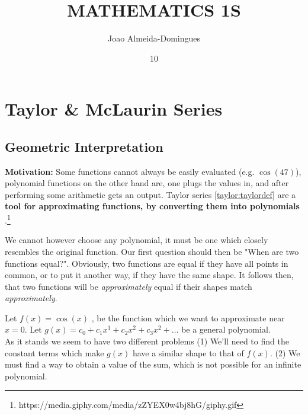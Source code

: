 \documentclass[english,course]{Notes}
\title{MATHEMATICS 1S}
\author{Joao Almeida-Domingues}
\date{10}{01}{2019}
\newcommand{\ita}[1]{\textit{#1}}
\begin{document}
\newpage

\section{Taylor \& McLaurin Series}


\subsection{Geometric Interpretation}
\textbf{Motivation:} Some functions cannot always be easily evaluated (e.g. $\cos(47)$), polynomial functions on the other hand are, one plugs the values in, and after performing some arithmetic  gets an output. Taylor series \ref{taylor:taylordef} are a \textbf{tool for approximating functions, by converting them into polynomials} .\footnote{https://media.giphy.com/media/zZYEX0w4bj8hG/giphy.gif} \\


\par{We cannot however choose any polynomial, it must be one which closely resembles the original function. Our first question should then be "When are two functions equal?". Obviously, two functions are equal if they have all points in common, or to put it another way, if they have the same shape. It follows then, that two functions will be \ita{approximately} equal if their shapes match \ita{approximately}.} \\

\par{ Let $f(x) = \cos(x)$ , be the function which we want to approximate near $x = 0$. Let $g(x) = c_0 + c_1x^1 + c_2x^2 + c_3x^2 + \dots $ be a general polynomial.} \\ As it stands we seem to have two different problems (1) We'll need to find the constant terms which make $g(x)$ have a similar shape to that of $f(x)$. (2) We must find a way to obtain a value of the sum, which is not possible for an infinite polynomial.
\end{document}
